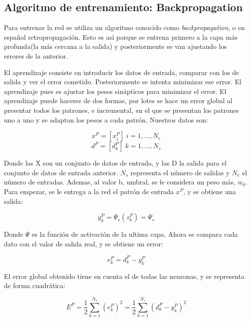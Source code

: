 \documentclass[12pt]{book}
\numberwithin{equation}{section}
\begin{document}
\subsection{Algoritmo de entrenamiento: Backpropagation}
Para entrenar la red se utiliza un algoritmo conocido como \textit{backpropagation}, o en español retropropagación. Esto es así porque se entrena primero a la capa más profunda(la más cercana a la salida) y posteriormente se van ajustando los errores de la anterior.

El aprendizaje consiste en introducir los datos de entrada, comparar con los de salida y ver el error cometido. Posteriormente se intenta minimizar ese error. El aprendizaje pues es ajustar los pesos sinápticos para minimizar el error. El aprendizaje puede hacerse de dos formas, por lotes se hace un error global al presentar todos los patrones, e incremental, en el que se presentan los patrones uno a uno y se adaptan los pesos a cada patrón. Nuestros datos son:

\begin{equation}
x^P = [x_i^P] \; i= 1,..., N_e
\end{equation}
\begin{equation}
d^P = [d_k^P] \; k=1,...,N_s
\end{equation}

Donde las X son un conjunto de datos de entrada, y las D la salida para el conjunto de datos de entrada anterior. $N_s$ representa el número de salidas y $N_e$ el número de entradas. Ademas, al valor b, umbral, se le considera un peso más, $w_0$. Para empezar, se le entrega a la red el patrón de entrada $x^P$, y se obtiene una salida:

\begin{equation}
y_k^P=\Psi _s(z^P_k)=\Psi _s
\end{equation}

Donde $\Psi$ es la función de activación de la ultima capa. Ahora se compara cada dato con el valor de salida real, y se obtiene un error:

\begin{equation}
e^P_k=d_k^P-y_k^P
\end{equation}

El error global obtenido tiene en cuenta el de todas las neuronas, y se representa de forma cuadrática:

\begin{equation}
E^P = \frac{1}{2} \sum_{k=1}^{N_s} (e_k^P)^2=\frac{1}{2}\sum_{k=1}^{N_s}(d_k^P-y_k^P)^2
\end{equation}
\end{document}
